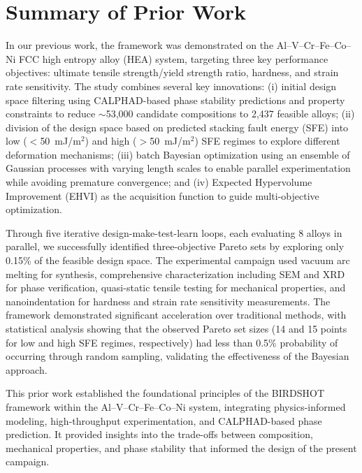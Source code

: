 \documentclass[final,5p,times,twocolumn]{elsarticle}
\begin{document}



\clearpage

\vspace{-2em}
\renewcommand*\contentsname{}
\tableofcontents



\section{Summary of Prior Work}

In our previous work, the framework was demonstrated on the Al–V–Cr–Fe–Co–Ni FCC high entropy alloy (HEA) system, targeting three key performance objectives: ultimate tensile strength/yield strength ratio, hardness, and strain rate sensitivity. The study combines several key innovations: (i) initial design space filtering using CALPHAD-based phase stability predictions and property constraints to reduce $\sim$53,000 candidate compositions to 2,437 feasible alloys; (ii) division of the design space based on predicted stacking fault energy (SFE) into low ($<$50~mJ/m$^2$) and high ($>$50~mJ/m$^2$) SFE regimes to explore different deformation mechanisms; (iii) batch Bayesian optimization using an ensemble of Gaussian processes with varying length scales to enable parallel experimentation while avoiding premature convergence; and (iv) Expected Hypervolume Improvement (EHVI) as the acquisition function to guide multi-objective optimization.

Through five iterative design-make-test-learn loops, each evaluating 8 alloys in parallel, we successfully identified three-objective Pareto sets by exploring only 0.15\% of the feasible design space. The experimental campaign used vacuum arc melting for synthesis, comprehensive characterization including SEM and XRD for phase verification, quasi-static tensile testing for mechanical properties, and nanoindentation for hardness and strain rate sensitivity measurements. The framework demonstrated significant acceleration over traditional methods, with statistical analysis showing that the observed Pareto set sizes (14 and 15 points for low and high SFE regimes, respectively) had less than 0.5\% probability of occurring through random sampling, validating the effectiveness of the Bayesian approach.


This prior work established the foundational principles of the BIRDSHOT framework within the Al–V–Cr–Fe–Co–Ni system, integrating physics-informed modeling, high-throughput experimentation, and CALPHAD-based phase prediction. It provided insights into the trade-offs between composition, mechanical properties, and phase stability that informed the design of the present campaign. 
\end{document}

